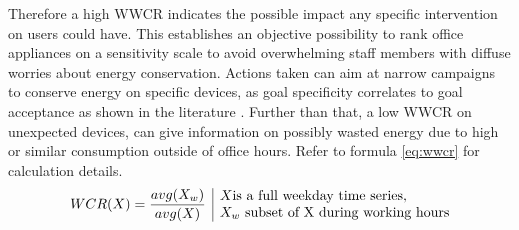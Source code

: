 Therefore a high WWCR indicates the possible impact any specific intervention on users could have. This establishes an objective possibility to rank office appliances on a sensitivity scale to avoid overwhelming staff members with diffuse worries about energy conservation. Actions taken can aim at narrow campaigns to conserve energy on specific devices, as goal specificity correlates to goal acceptance as shown in the literature \cite{steers}. Further than that, a low WWCR on unexpected devices, can give information on possibly wasted energy due to high or similar consumption outside of office hours. Refer to formula \ref{eq:wwcr} for calculation details. 
\begin{equation}\label{eq:wwcr}
	\begin{array}{l|l}
		\multirow{2}{*}{$WCR (X) = \dfrac{avg(X_w)}{avg(X)}$} & X \text{is a full weekday time series, }\\ & X_w\text{ subset of X during working hours} 
	\end{array}
\end{equation}
